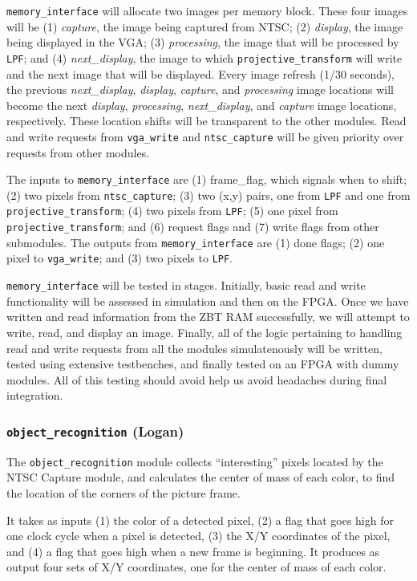 \documentclass[10pt]{article}
\begin{document}
{\tt memory\_interface} will allocate two images per memory block. These four images will be (1) {\it capture}, the image being captured from NTSC; (2) {\it display}, the image being displayed in the VGA; (3) {\it processing}, the image that will be processed by {\tt LPF}; and (4) {\it next\_display}, the image to which {\tt projective\_transform} will write and the next image that will be displayed. Every image refresh (1/30 seconds), the previous {\it next\_display}, {\it display}, {\it capture}, and {\it processing} image locations will become the next {\it display}, {\it processing}, {\it next\_display}, and {\it capture} image locations, respectively. These location shifts will be transparent to the other modules. Read and write requests from {\tt vga\_write} and {\tt ntsc\_capture} will be given priority over requests from other modules.

The inputs to {\tt memory\_interface} are (1) frame\_flag, which signals when to shift; (2) two pixels from {\tt ntsc\_capture}; (3) two (x,y) pairs, one from {\tt LPF} and one from {\tt projective\_transform}; (4) two pixels from {\tt LPF}; (5) one pixel from {\tt projective\_transform}; and (6) request flags and (7) write flags from other submodules. The outputs from {\tt memory\_interface} are (1) done flags; (2) one pixel to {\tt vga\_write}; and (3) two pixels to {\tt LPF}.

{\tt memory\_interface} will be tested in stages. Initially, basic read and write functionality will be assessed in simulation and then on the FPGA. Once we have written and read information from the ZBT RAM successfully, we will attempt to write, read, and display an image. Finally, all of the logic pertaining to handling read and write requests from all the modules simulatenously will be written, tested using extensive testbenches, and finally tested on an FPGA with dummy modules. All of this testing should avoid help us avoid headaches during final integration.

\subsubsection{{\tt object\_recognition} (Logan)}
The {\tt object\_recognition} module collects ``interesting'' pixels located by the NTSC Capture module, and calculates the center of mass of each color, to find the location of the corners of the picture frame.

It takes as inputs (1) the color of a detected pixel, (2) a flag that goes high for one clock cycle when a pixel is detected, (3) the X/Y coordinates of the pixel, and (4) a flag that goes high when a new frame is beginning. It produces as output four sets of X/Y coordinates, one for the center of mass of each color.
\end{document}
